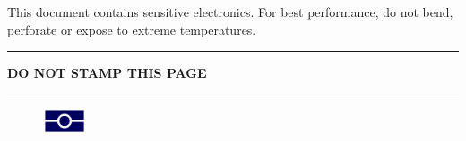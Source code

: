 \newpage
{}
\newgeometry{}
\begin{center}
\color{Blue}
This document contains sensitive electronics. For best performance, do not bend, perforate or expose to extreme temperatures.\\
\vspace{0.5in}
\hrule
\vspace{0.1in}
\bf DO NOT STAMP THIS PAGE
\vspace{0.1in}
\hrule
\vspace{0.5in}
\begin{figure}[h]
    \centering
    \includegraphics[width=0.5in]{images/epassport_dark.png}
\end{figure}
\end{center}
\restoregeometry